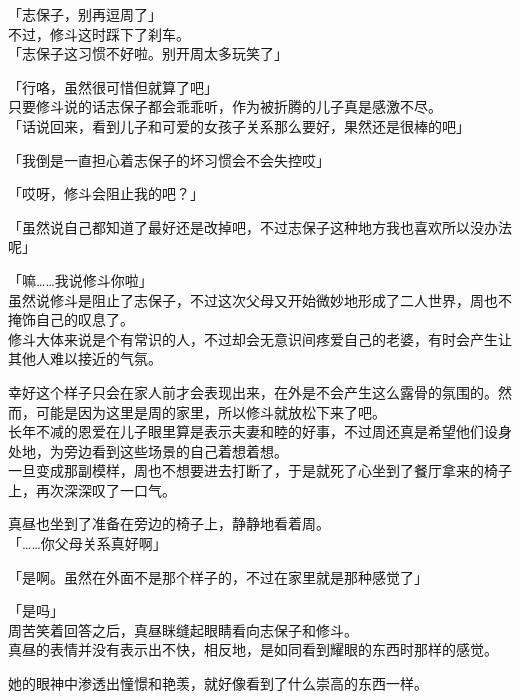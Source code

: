 「志保子，别再逗周了」\\

不过，修斗这时踩下了刹车。\\

「志保子这习惯不好啦。别开周太多玩笑了」

「行咯，虽然很可惜但就算了吧」\\

只要修斗说的话志保子都会乖乖听，作为被折腾的儿子真是感激不尽。\\

「话说回来，看到儿子和可爱的女孩子关系那么要好，果然还是很棒的吧」

「我倒是一直担心着志保子的坏习惯会不会失控哎」

「哎呀，修斗会阻止我的吧？」

「虽然说自己都知道了最好还是改掉吧，不过志保子这种地方我也喜欢所以没办法呢」

「嘛……我说修斗你啦」\\

虽然说修斗是阻止了志保子，不过这次父母又开始微妙地形成了二人世界，周也不掩饰自己的叹息了。\\

修斗大体来说是个有常识的人，不过却会无意识间疼爱自己的老婆，有时会产生让其他人难以接近的气氛。

幸好这个样子只会在家人前才会表现出来，在外是不会产生这么露骨的氛围的。然而，可能是因为这里是周的家里，所以修斗就放松下来了吧。\\

长年不减的恩爱在儿子眼里算是表示夫妻和睦的好事，不过周还真是希望他们设身处地，为旁边看到这些场景的自己着想着想。\\

一旦变成那副模样，周也不想要进去打断了，于是就死了心坐到了餐厅拿来的椅子上，再次深深叹了一口气。

真昼也坐到了准备在旁边的椅子上，静静地看着周。\\

「……你父母关系真好啊」

「是啊。虽然在外面不是那个样子的，不过在家里就是那种感觉了」

「是吗」\\

周苦笑着回答之后，真昼眯缝起眼睛看向志保子和修斗。\\

真昼的表情并没有表示出不快，相反地，是如同看到耀眼的东西时那样的感觉。

她的眼神中渗透出憧憬和艳羡，就好像看到了什么崇高的东西一样。\\

